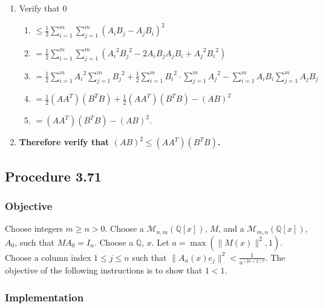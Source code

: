 \documentclass[twocolumn]{article}
\newcommand{\procedure}[2][]{\subsection*{Procedure #2 \ifthenelse{\equal{#1}{}}{}{(#1)}}\label{sec:procedure #2}}
\newcommand{\objective}{\subsubsection*{Objective}}
\newcommand{\implementation}{\subsubsection*{Implementation}}
\begin{document}
				\begin{enumerate}
					\item Verify that $0$
					\begin{enumerate}
						\item $\le\frac{1}{2}\sum_{i=1}^m\sum_{j=1}^m (A_iB_j-A_jB_i)^2$
						\item $=\frac{1}{2}\sum_{i=1}^m\sum_{j=1}^m ({A_i}^2{B_j}^2-2A_iB_jA_jB_i+{A_j}^2{B_i}^2)$
						\item $=\frac{1}{2}\sum_{i=1}^m {A_i}^2\sum_{j=1}^m {B_j}^2+\frac{1}{2}\sum_{i=1}^m {B_i}^2\cdot\allowbreak\sum_{j=1}^m {A_j}^2-\sum_{i=1}^m A_iB_i\sum_{j=1}^m A_jB_j$
						\item $=\frac{1}{2}(AA^T)(B^TB)+\frac{1}{2}(AA^T)(B^TB)-(AB)^2$
						\item $=(AA^T)(B^TB)-(AB)^2$.
					\end{enumerate}
					\item \textbf{Therefore verify that $(AB)^2\le(AA^T)(B^TB)$.}
				\end{enumerate}
		\procedure{3.71}
			\objective
				Choose integers $m\ge n>0$. Choose a $\mathcal{M}_{n,m}(\mathbb{Q}[x])$, $M$, and a $\mathcal{M}_{m,n}(\mathbb{Q}[x])$, $A_0$, such that $MA_0=I_n$. Choose a $\mathbb{Q}$, $x$. Let $a=\max(\lVert M(x)\rVert^2,1)$. Choose a column index $1\le j\le n$ such that $\lVert A_n(x)e_j\rVert^2<\frac{1}{a^{(2n+2)!!}}$. The objective of the following instructions is to show that $1<1$.
			\implementation
\end{document}
